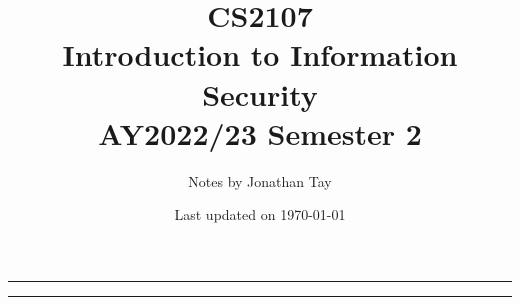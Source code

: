 \documentclass{article}
\title{\vspace{-1cm}\textbf{CS2107 \\[0.25em] Introduction to Information Security} \\[2em] \Large AY2022/23 Semester 2 \\[1em]}
\author{Notes by Jonathan Tay}
\date{Last updated on \today}
\newcommand{\pageline}[1]{\par\noindent\rule{\textwidth}{#1}} %
\begin{document}
\linespread{1.4}\selectfont
{} %
\maketitle
\pageline{1.5pt}
\tableofcontents
\pageline{1.5pt}
\linespread{1.1}\selectfont

\newpage
{} %
\begin{multicols*}{2}
\end{multicols*}
\end{document}
